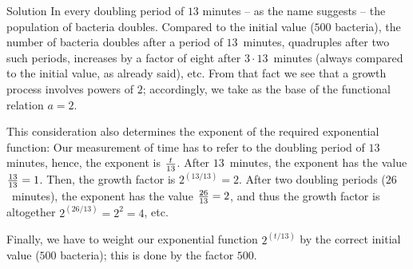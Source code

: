 \begin{MContent}
\begin{MExercise}
  \begin{MHint}{Solution}
  In every doubling period of $13$ minutes -- as the name suggests -- the population of bacteria doubles.
  Compared to the initial value ($500$ bacteria), the number of bacteria doubles after a period of $13$~minutes, 
  quadruples after two such periods, increases by a factor of eight after $3 \cdot 13$~minutes (always compared
  to the initial value, as already said), etc. From that fact we see that a growth process involves powers 
  of $2$; accordingly, we take as the base of the functional relation $a = 2$. 

  This consideration also determines the exponent of the required exponential function: Our measurement 
  of time has to refer to the doubling period of $13$ minutes, hence, the exponent is $\tfrac{t}{13}$. 
  After $13$~minutes, the exponent has the value $\tfrac{13}{13} = 1$. Then, the growth factor is 
  $2^{(13/13)}=2$. After two doubling periods ($26$~minutes), the exponent has the value $\tfrac{26}{13} = 2$, 
  and thus the growth factor is altogether $2^{(26/13)} = 2^2 = 4$, etc. 

  Finally, we have to weight our exponential function $2^{(t/13)}$ by the correct initial value 
  ($500$ bacteria); this is done by the factor $500$.
 \end{MHint}
\end{MExercise}
\end{MContent}

